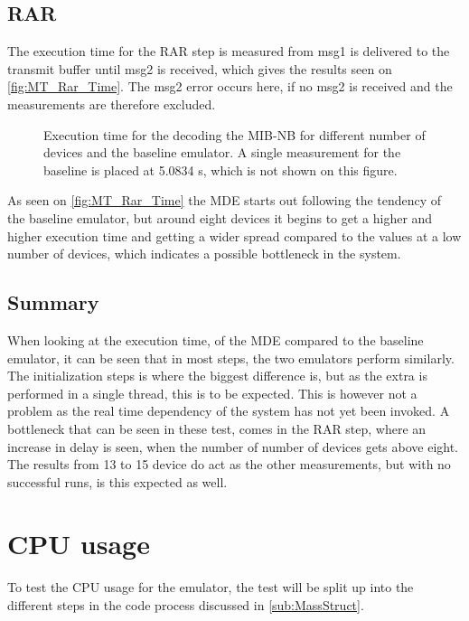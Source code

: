 \subsection{RAR}
The execution time for the RAR step is measured from msg1 is delivered to the transmit buffer until msg2 is received, which gives the results seen on \autoref{fig:MT_Rar_Time}. The msg2 error occurs here, if no msg2 is received and the measurements are therefore excluded. 

\begin{figure}[H]
\centering
\resizebox{0.5\textwidth}{!}{
}
\caption{Execution time for the decoding the MIB-NB for different number of devices and the baseline emulator. A single measurement for the baseline is placed at 5.0834 s, which is not shown on this figure.}
\label{fig:MT_Rar_Time}
\end{figure}

As seen on \autoref{fig:MT_Rar_Time} the MDE starts out following the tendency of the baseline emulator, but around eight devices it begins to get a higher and higher execution time and getting a wider spread compared to the values at a low number of devices, which indicates a possible bottleneck in the system.

\subsection{Summary}
When looking at the execution time, of the MDE compared to the baseline emulator, it can be seen that in most steps, the two emulators perform similarly. The initialization steps is where the biggest difference is, but as the extra is performed in a single thread, this is to be expected. This is however not a problem as the real time dependency of the system has not yet been invoked. A bottleneck that can be seen in these test, comes in the RAR step, where an increase in delay is seen, when the number of number of devices gets above eight. The results from 13 to 15 device do act as the other measurements, but with no successful runs, is this expected as well. 


\section{CPU usage}
To test the CPU usage for the emulator, the test will be split up into the different steps in the code process discussed in \autoref{sub:MassStruct}. 

